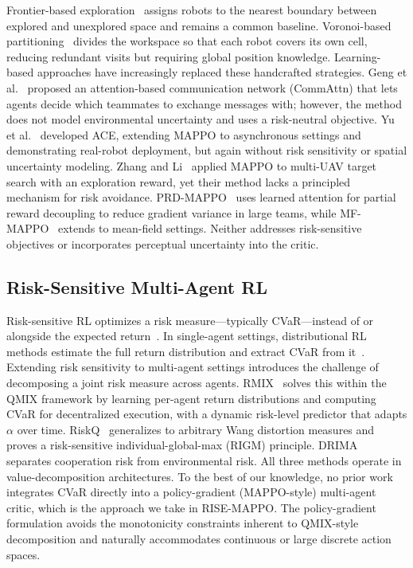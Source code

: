 \documentclass[letterpaper]{IEEEtran}
\begin{document}
Frontier-based exploration~\cite{yamauchi1997frontier} assigns robots to the nearest boundary between explored and unexplored space and remains a common baseline. Voronoi-based partitioning~\cite{breitenmoser2010voronoi} divides the workspace so that each robot covers its own cell, reducing redundant visits but requiring global position knowledge. Learning-based approaches have increasingly replaced these handcrafted strategies. Geng et al.~\cite{geng2019learning} proposed an attention-based communication network (CommAttn) that lets agents decide which teammates to exchange messages with; however, the method does not model environmental uncertainty and uses a risk-neutral objective. Yu et al.~\cite{yu2023asynchronous} developed ACE, extending MAPPO to asynchronous settings and demonstrating real-robot deployment, but again without risk sensitivity or spatial uncertainty modeling. Zhang and Li~\cite{zhang2025cooperative} applied MAPPO to multi-UAV target search with an exploration reward, yet their method lacks a principled mechanism for risk avoidance. PRD-MAPPO~\cite{kapoor2024prd} uses learned attention for partial reward decoupling to reduce gradient variance in large teams, while MF-MAPPO~\cite{jeloka2025meanfield} extends to mean-field settings. Neither addresses risk-sensitive objectives or incorporates perceptual uncertainty into the critic.

\subsection{Risk-Sensitive Multi-Agent RL}

Risk-sensitive RL optimizes a risk measure---typically CVaR---instead of or alongside the expected return~\cite{chow2014cvar}. In single-agent settings, distributional RL methods estimate the full return distribution and extract CVaR from it~\cite{dabney2018distributional, wang2023near}. Extending risk sensitivity to multi-agent settings introduces the challenge of decomposing a joint risk measure across agents. RMIX~\cite{qiu2022rmix} solves this within the QMIX framework by learning per-agent return distributions and computing CVaR for decentralized execution, with a dynamic risk-level predictor that adapts $\alpha$ over time. RiskQ~\cite{shen2023riskq} generalizes to arbitrary Wang distortion measures and proves a risk-sensitive individual-global-max (RIGM) principle. DRIMA~\cite{sun2023drima} separates cooperation risk from environmental risk. All three methods operate in value-decomposition architectures. To the best of our knowledge, no prior work integrates CVaR directly into a policy-gradient (MAPPO-style) multi-agent critic, which is the approach we take in RISE-MAPPO. The policy-gradient formulation avoids the monotonicity constraints inherent to QMIX-style decomposition and naturally accommodates continuous or large discrete action spaces.
\end{document}
